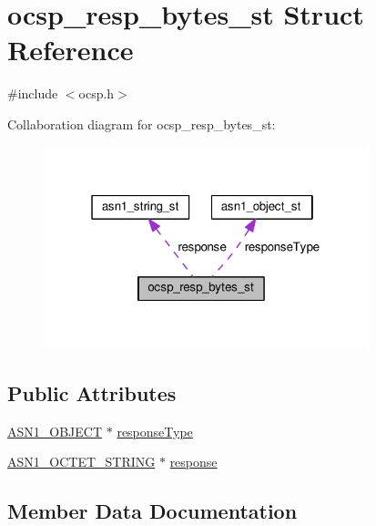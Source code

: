 \hypertarget{structocsp__resp__bytes__st}{}\section{ocsp\+\_\+resp\+\_\+bytes\+\_\+st Struct Reference}
\label{structocsp__resp__bytes__st}


{\ttfamily \#include $<$ocsp.\+h$>$}



Collaboration diagram for ocsp\+\_\+resp\+\_\+bytes\+\_\+st\+:
\nopagebreak
\begin{figure}[H]
\begin{center}
\leavevmode
\includegraphics[width=268pt]{structocsp__resp__bytes__st__coll__graph}
\end{center}
\end{figure}
\subsection*{Public Attributes}
\begin{DoxyCompactItemize}
\item 
\hyperlink{asn1_8h_ae10c08e4e6b23f67a39b2add932ec48f}{A\+S\+N1\+\_\+\+O\+B\+J\+E\+CT} $\ast$ \hyperlink{structocsp__resp__bytes__st_a304d3f8cf4f98279dca0624763ce8b01}{response\+Type}
\item 
\hyperlink{ossl__typ_8h_afbd05e94e0f0430a2b729473efec88c1}{A\+S\+N1\+\_\+\+O\+C\+T\+E\+T\+\_\+\+S\+T\+R\+I\+NG} $\ast$ \hyperlink{structocsp__resp__bytes__st_a98f9926c70716d7d4438aa7e87d17649}{response}
\end{DoxyCompactItemize}


\subsection{Member Data Documentation}
